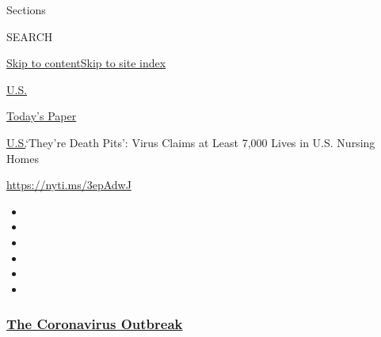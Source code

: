 Sections

SEARCH

\protect\hyperlink{site-content}{Skip to
content}\protect\hyperlink{site-index}{Skip to site index}

\href{https://www.nytimes3xbfgragh.onion/section/us}{U.S.}

\href{https://myaccount.nytimes3xbfgragh.onion/auth/login?response_type=cookie\&client_id=vi}{}

\href{https://www.nytimes3xbfgragh.onion/section/todayspaper}{Today's
Paper}

\href{/section/us}{U.S.}\textbar{}`They're Death Pits': Virus Claims at
Least 7,000 Lives in U.S. Nursing Homes

\url{https://nyti.ms/3epAdwJ}

\begin{itemize}
\item
\item
\item
\item
\item
\item
\end{itemize}

\hypertarget{the-coronavirus-outbreak}{%
\subsubsection{\texorpdfstring{\href{https://www.nytimes3xbfgragh.onion/news-event/coronavirus?name=styln-coronavirus-national\&region=TOP_BANNER\&block=storyline_menu_recirc\&action=click\&pgtype=Article\&impression_id=23aaa1e0-f2bc-11ea-9197-0b8458576cb9\&variant=undefined}{The
Coronavirus
Outbreak}}{The Coronavirus Outbreak}}\label{the-coronavirus-outbreak}}

